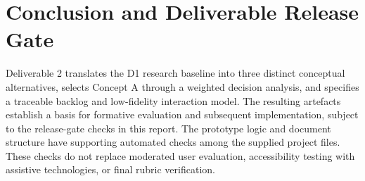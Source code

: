 \documentclass[12pt,a4paper]{article}
\begin{document}
\section{Conclusion and Deliverable Release Gate}

Deliverable 2 translates the D1 research baseline into three distinct conceptual alternatives, selects Concept A through a weighted decision analysis, and specifies a traceable backlog and low-fidelity interaction model. The resulting artefacts establish a basis for formative evaluation and subsequent implementation, subject to the release-gate checks in this report. The prototype logic and document structure have supporting automated checks among the supplied project files. These checks do not replace moderated user evaluation, accessibility testing with assistive technologies, or final rubric verification.
\end{document}

